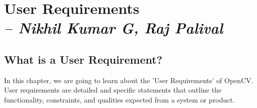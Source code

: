 \chapter{User Requirements\\
\small{\textit{-- Nikhil Kumar G, Raj Palival}}
\label{Chapter::User Requirements}}

\section{What is a User Requirement? \label{Section::UserRequirementsIntroduction}}
In this chapter, we are going to learn about the 'User Requirements' of OpenCV. User requirements are detailed and specific statements that outline the functionality, constraints, and qualities expected from a system or product. 

